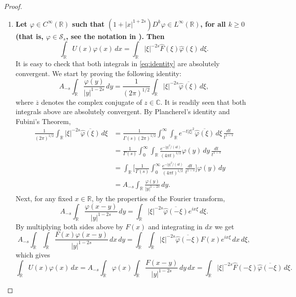 \documentclass[a4paper,11pt,reqno]{amsart}
\newcommand{\R}{\mathbb{R}}
\newcommand{\C}{\mathbb{C}}
\theoremstyle{definition}
\numberwithin{equation}{section}
\begin{document}
\begin{proof}
\begin{enumerate}[$(1)$]
\item \textbf{Let $\varphi\in C^\infty(\R)$ such that $(1+|x|^{1+2s})D^k\varphi\in L^\infty(\R)$,
for all $k\geq0$ (that is, $\varphi\in\mathcal{S}_s$, see the notation in \cite[p.~73]{Silvestre-CPAM}). Then}
\begin{equation}
\label{eq:identity}
\int_{\R}U(x)\varphi(x)\,dx=\int_{\R}|\xi|^{-2s}\widehat{F}(\xi)\widehat{\varphi}(\xi)\,d\xi.
\end{equation}
It is easy to check that both integrals in \eqref{eq:identity} are absolutely convergent.
We start by proving the following identity:
$$
A_{-s}\int_{\R}\frac{\varphi(y)}{|y|^{1-2s}}\,dy =
\frac{1}{(2\pi)^{1/2}}\int_{\R}|\xi|^{-2s}\overline{\widehat{\varphi}(\xi)}\,d\xi,
$$
where $\overline{z}$ denotes the complex conjugate of $z\in\C$.
It is readily seen that both integrals above are absolutely convergent.
By Plancherel's identity and Fubini's Theorem,
\begin{align*}
\frac{1}{(2\pi)^{1/2}}\int_{\R}|\xi|^{-2s}\overline{\widehat{\varphi}(\xi)}\,d\xi &=
\frac{1}{\Gamma(s)(2\pi)^{1/2}} \int_0^\infty\int_{\R}e^{-t|\xi|^2} 
\overline{\widehat{\varphi}(\xi)}\,d\xi\,\frac{dt}{t^{1-s}} \\
&= \frac{1}{\Gamma(s)} \int_0^\infty \int_{\R} \frac{e^{-|y|^2/(4t)}}{(4\pi t)^{1/2}}
\varphi(y)\,dy\,\frac{dt}{t^{1-s}} \\
&= \int_{\R}\bigg[\frac{1}{\Gamma(s)}\int_0^\infty
\frac{e^{-|y|^2/(4t)}}{(4\pi t)^{1/2}}\,\frac{dt}{t^{1-s}}\bigg]\varphi(y)\,dy \\
&= A_{-s}\int_{\R}\frac{\varphi(y)}{|y|^{1-2s}}\,dy.
\end{align*}
Next, for any fixed $x\in\R$, by the properties of the Fourier transform,
$$
A_{-s}\int_{\R}\frac{\varphi(x-y)}{|y|^{1-2s}}\,dy = \int_{\R}|\xi|^{-2s}
\overline{\widehat{\varphi}(-\xi)}e^{ix\xi}\,d\xi.
$$
By multiplying both sides above by $F(x)$ and integrating in $dx$ we get
$$
A_{-s}\int_{\R}\int_{\R}\frac{F(x)\varphi(x-y)}{|y|^{1-2s}}\,dx\,dy
=\int_{\R}\int_{\R}|\xi|^{-2s}\overline{\widehat{\varphi}(-\xi)}F(x)e^{ix\xi}\,dx\,d\xi,
$$
which gives
$$
\int_{\R}U(x)\varphi(x)\,dx = A_{-s}\int_{\R}\varphi(x) \int_{\R}\frac{F(x-y)}{|y|^{1-2s}}\,dy\,dx
=\int_{\R}|\xi|^{-2s}\widehat{F}(-\xi)\overline{\widehat{\varphi}(-\xi)}\,d\xi.
$$


\end{enumerate}
\end{proof}
\end{document}
